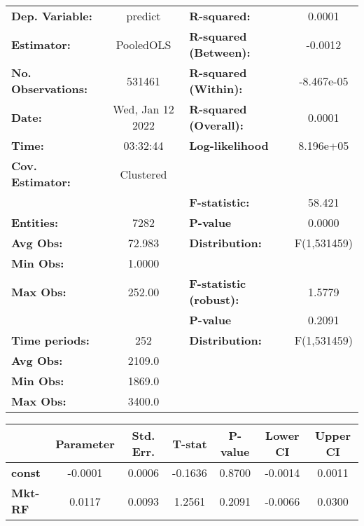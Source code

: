 \begin{center}
\begin{tabular}{lclc}
\toprule
\textbf{Dep. Variable:}    &      predict       & \textbf{  R-squared:         }   &      0.0001      \\
\textbf{Estimator:}        &     PooledOLS      & \textbf{  R-squared (Between):}  &     -0.0012      \\
\textbf{No. Observations:} &       531461       & \textbf{  R-squared (Within):}   &    -8.467e-05    \\
\textbf{Date:}             &  Wed, Jan 12 2022  & \textbf{  R-squared (Overall):}  &      0.0001      \\
\textbf{Time:}             &      03:32:44      & \textbf{  Log-likelihood     }   &    8.196e+05     \\
\textbf{Cov. Estimator:}   &     Clustered      & \textbf{                     }   &                  \\
\textbf{}                  &                    & \textbf{  F-statistic:       }   &      58.421      \\
\textbf{Entities:}         &        7282        & \textbf{  P-value            }   &      0.0000      \\
\textbf{Avg Obs:}          &       72.983       & \textbf{  Distribution:      }   &   F(1,531459)    \\
\textbf{Min Obs:}          &       1.0000       & \textbf{                     }   &                  \\
\textbf{Max Obs:}          &       252.00       & \textbf{  F-statistic (robust):} &      1.5779      \\
\textbf{}                  &                    & \textbf{  P-value            }   &      0.2091      \\
\textbf{Time periods:}     &        252         & \textbf{  Distribution:      }   &   F(1,531459)    \\
\textbf{Avg Obs:}          &       2109.0       & \textbf{                     }   &                  \\
\textbf{Min Obs:}          &       1869.0       & \textbf{                     }   &                  \\
\textbf{Max Obs:}          &       3400.0       & \textbf{                     }   &                  \\
\bottomrule
\end{tabular}
\begin{tabular}{lcccccc}
                & \textbf{Parameter} & \textbf{Std. Err.} & \textbf{T-stat} & \textbf{P-value} & \textbf{Lower CI} & \textbf{Upper CI}  \\
\midrule
\textbf{const}  &      -0.0001       &       0.0006       &     -0.1636     &      0.8700      &      -0.0014      &       0.0011       \\
\textbf{Mkt-RF} &       0.0117       &       0.0093       &      1.2561     &      0.2091      &      -0.0066      &       0.0300       \\
\bottomrule
\end{tabular}
\end{center}
